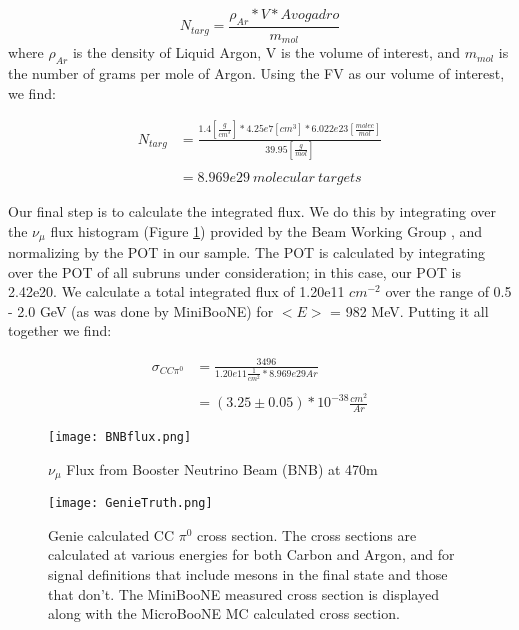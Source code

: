 \documentclass[a4paper]{article}
\begin{document}
\begin{equation} \label{eq:1}
  N_{targ} = \frac{\rho_{Ar} * V * Avogadro}{m_{mol}} 
\end{equation}
\noindent where $\rho_{Ar}$ is the density of Liquid Argon, V is the volume of interest, and $m_{mol}$ is the number of grams per mole of Argon.  Using the FV as our volume of interest, we find: 

\begin{align}
N_{targ} &= \frac{1.4 [\frac{g}{cm^3}] * 4.25e7 [cm^3] * 6.022e23 [\frac{molec}{mol}]}{39.95 [\frac{g}{mol}]} \\\\
&= 8.969e29\ molecular\ targets
\end{align}


\par Our final step is to calculate the integrated flux.  We do this by integrating over the $\nu_\mu$ flux histogram (Figure \ref{fig:flux}) provided by the Beam Working Group \cite{bib:flux}, and normalizing by the POT in our sample. The POT is calculated by integrating over the POT of all subruns under consideration; in this case, our POT is 2.42e20.  We calculate a total integrated flux of 1.20e11 $cm^{-2}$ over the range of 0.5 - 2.0 GeV (as was done by MiniBooNE) for $<E>$ = 982 MeV. 
\noindent Putting it all together we find:


\begin{align}
\sigma_{CC\pi^0} &= \frac{3496}{1.20e11 \frac{1}{cm^2} * 8.969e29 Ar } \\\\
&= (3.25 \pm 0.05) *10^{-38} \frac{cm^2}{Ar}
\end{align}

\begin{figure}[h!]
\centering
\texttt{[image: BNBflux.png]}
\caption{$\nu_\mu$ Flux from Booster Neutrino Beam (BNB) at 470m }
\label{fig:flux}
\end{figure}

\begin{figure}[h!]
\centering
\texttt{[image: GenieTruth.png]}
\caption{Genie calculated CC $\pi^0$ cross section. The cross sections are calculated at various energies for both Carbon and Argon, and for signal definitions that include mesons in the final state and those that don't. The MiniBooNE measured cross section is displayed along with the MicroBooNE MC calculated cross section. }
\label{fig:genietruth}
\end{figure}
\end{document}
